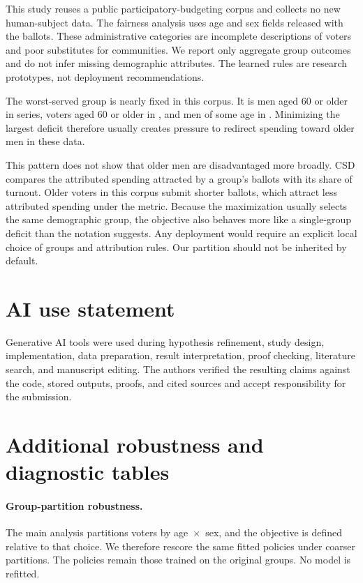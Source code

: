 \documentclass{article}
\begin{document}
This study reuses a public participatory-budgeting corpus and collects no new
human-subject data. The fairness analysis uses age and sex fields released with
the ballots. These administrative categories are incomplete descriptions of
voters and poor substitutes for communities. We report only aggregate group
outcomes and do not infer missing demographic attributes. The learned rules are
research prototypes, not deployment recommendations.

The worst-served group is nearly fixed in this corpus. It is men aged 60 or
older in \WorstCohortSeniorMale{} series, voters aged 60 or older in
\WorstCohortSenior{}, and men of some age in \WorstCohortMale{}. Minimizing the
largest deficit therefore usually creates pressure to redirect spending toward
older men in these data.

This pattern does not show that older men are disadvantaged more broadly. CSD
compares the attributed spending attracted by a group's ballots with its share
of turnout. Older voters in this corpus submit shorter ballots, which attract
less attributed spending under the metric. Because the maximization usually
selects the same demographic group, the objective also behaves more like a
single-group deficit than the notation suggests. Any deployment would require
an explicit local choice of groups and attribution rules. Our partition should
not be inherited by default.

\section*{AI use statement}

Generative AI tools were used during hypothesis refinement, study design,
implementation, data preparation, result interpretation, proof checking,
literature search, and manuscript editing. The authors verified the resulting
claims against the code, stored outputs, proofs, and cited sources and accept
responsibility for the submission.




\appendix


\section{Additional robustness and diagnostic tables}
\label{sec:scheme}

\paragraph{Group-partition robustness.}
The main analysis partitions voters by age~$\times$~sex, and the objective is
defined relative to that choice. We therefore rescore the same fitted policies
under coarser partitions. The policies remain those trained on the original
groups. No model is refitted.
\end{document}
